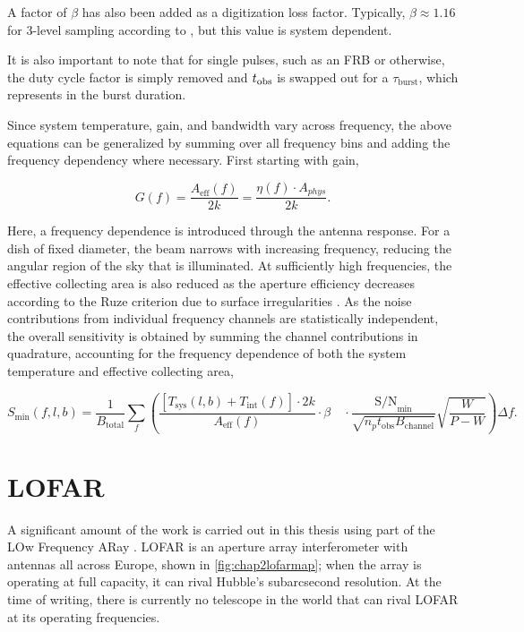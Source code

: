 A factor of \( \beta \) has also been added as a digitization loss factor. Typically, \( \beta \approx 1.16 \) for 3-level sampling according to \cite{kouwenhoven_effect_2001}, but this value is system dependent.  

It is also important to note that for single pulses, such as an FRB or otherwise, the duty cycle factor is simply removed and $t_{\rm{obs}}$ is swapped out for a $\tau_{\text{burst}}$, which represents in the burst duration. 


Since system temperature, gain, and bandwidth vary across frequency, the above equations can be generalized by summing over all frequency bins and adding the frequency dependency where necessary. First starting with gain, 

\begin{equation}
    G(f) = 
    \frac{A_{\text{eff}}(f)}{2k} = \frac{\eta (f) \cdot A_{phys}}{2k}.
\end{equation}

Here, a frequency dependence is introduced through the antenna response. For a dish of fixed diameter, the beam narrows with increasing frequency, reducing the angular region of the sky that is illuminated. At sufficiently high frequencies, the effective collecting area is also reduced as the aperture efficiency decreases according to the Ruze criterion due to surface irregularities \citep{ruze_antenna_1966}. As the noise contributions from individual frequency channels are statistically independent, the overall sensitivity is obtained by summing the channel contributions in quadrature, accounting for the frequency dependence of both the system temperature and effective collecting area, 

\begin{equation}
\boxed{
S_{\min} (f, l, b) = \frac{1}{B_{\text{total}}} \sum_{f} \left(  \frac{\left[ T_{\text{sys}}(l,b) + T_{\text{int} }(f) \right] \cdot 2 k}{A_{\text {eff} }(f)} \cdot \beta  \quad  \cdot \frac{\text{S/N}_{\text{min}}}{\sqrt{n_p t_{\text{obs}} B_{\text{channel}}}} \sqrt{\frac{W}{P - W}} \right) \Delta f}.
\label{eq:radiometer_equation}
\end{equation}



\section{LOFAR} \label{sec:LOFARchap2}

A significant amount of the work is carried out in this thesis using part of the LOw Frequency ARay \citep[LOFAR;][]{van_haarlem_lofar_2013}.  LOFAR is an aperture array interferometer with antennas all across Europe, shown in \cref{fig:chap2lofarmap}; when the array is operating at full capacity, it can rival Hubble's subarcsecond resolution. At the time of writing, there is currently no telescope in the world that can rival LOFAR at its operating frequencies. 

